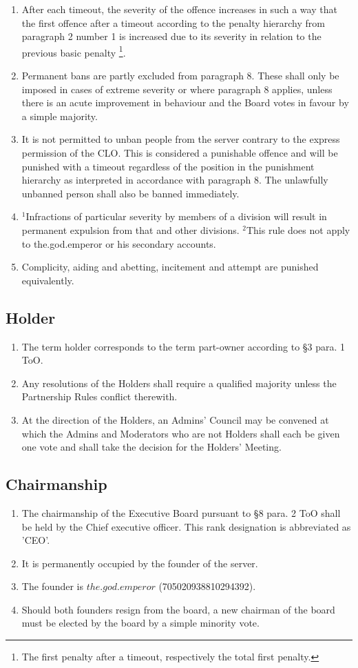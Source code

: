 \documentclass{article}
\begin{document}
\begin{enumerate}[(1)]
    \item After each timeout, the severity of the offence increases in such a way that the first offence after a timeout according to the penalty hierarchy from paragraph 2 number 1  is increased due to its severity in relation to the previous basic penalty \footnote{The first penalty after a timeout, respectively the total first penalty.}.
	\item Permanent bans are partly excluded from paragraph 8. These shall only be imposed in cases of extreme severity or where paragraph 8 applies, unless there is an acute improvement in behaviour and the Board votes in favour by a simple majority.
	\item It is not permitted to unban people from the server contrary to the express permission of the CLO. This is considered a punishable offence and will be punished with a timeout regardless of the position in the punishment hierarchy as interpreted in accordance with paragraph 8. The unlawfully unbanned person shall also be banned immediately.
	\item $^{1}$Infractions of particular severity by members of a division will result in permanent expulsion from that and other divisions. $^{2}$This rule does not apply to the.god.emperor or his secondary accounts.
	\item Complicity, aiding and abetting, incitement and attempt are punished equivalently.
\end{enumerate}

\subsection{Holder}
\begin{enumerate}[(1)]
	\item The term holder corresponds to the term part-owner according to §3 para. 1 ToO.
	\item Any resolutions of the Holders shall require a qualified majority unless the Partnership Rules conflict therewith.
	\item At the direction of the Holders, an Admins' Council may be convened at which the Admins and Moderators who are not Holders shall each be given one vote and shall take the decision for the Holders' Meeting.
\end{enumerate}

\subsection{Chairmanship}
\begin{enumerate}[(1)]
	\item The chairmanship of the Executive Board pursuant to §8 para. 2 ToO shall be held by the Chief executive officer. This rank designation is abbreviated as 'CEO'.
	\item It is permanently occupied by the founder of the server.
	\item The founder is $the.god.emperor$ (705020938810294392).
	\item Should both founders resign from the board, a new chairman of the board must be elected by the board by a simple minority vote.
\end{enumerate}
\end{document}
